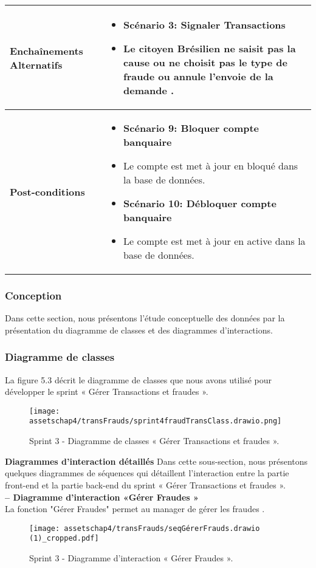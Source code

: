 \begin{longtable}{|>{\arraybackslash}p{4.2cm}|>{\arraybackslash}p{12.5cm}|}
\hline
\textbf{Enchaînements Alternatifs} &
\begin{itemize}[label=]
  \item\textbf{Scénario 3: Signaler Transactions}
  \item Le citoyen Brésilien ne saisit pas la cause ou ne choisit pas le type de fraude ou annule l'envoie de la demande .
   \end{itemize} \\
\hline
\textbf{Post-conditions } &
\begin{itemize}[label=]
   \item\textbf{Scénario 9: Bloquer compte banquaire}
  \item Le compte est met à jour en bloqué dans la base de données.
   \item\textbf{Scénario 10: Débloquer compte banquaire}
   \item Le compte est met à jour en active dans la base de données.
\end{itemize} \\
\end{longtable}

\subsubsection{Conception}
Dans cette section, nous présentons l'étude conceptuelle des données par la présentation du
diagramme de classes et des diagrammes d'interactions.
\subsubsection{Diagramme de classes}
La figure 5.3 décrit le diagramme de classes que nous avons utilisé pour développer le sprint « Gérer Transactions et fraudes ».

\begin{figure}[H]
\centering
\texttt{[image: assetschap4/transFrauds/sprint4fraudTransClass.drawio.png]}
\caption{ Sprint 3 - Diagramme de classes « Gérer Transactions et fraudes ». }
\end{figure}

\textbf{Diagrammes d'interaction détaillés}
Dans cette sous-section, nous présentons quelques diagrammes de séquences qui détaillent
l'interaction entre la partie front-end et la partie back-end du sprint « Gérer Transactions et fraudes ».\\




\textbf{– Diagramme d'interaction «Gérer Fraudes »}\\
La fonction "Gérer Fraudes" permet au manager de gérer les fraudes .
\begin{figure}[H]
\centering
\texttt{[image: assetschap4/transFrauds/seqGérerFrauds.drawio (1)\_cropped.pdf]}
\caption{ Sprint 3 - Diagramme d'interaction « Gérer Fraudes ». }
\end{figure}




